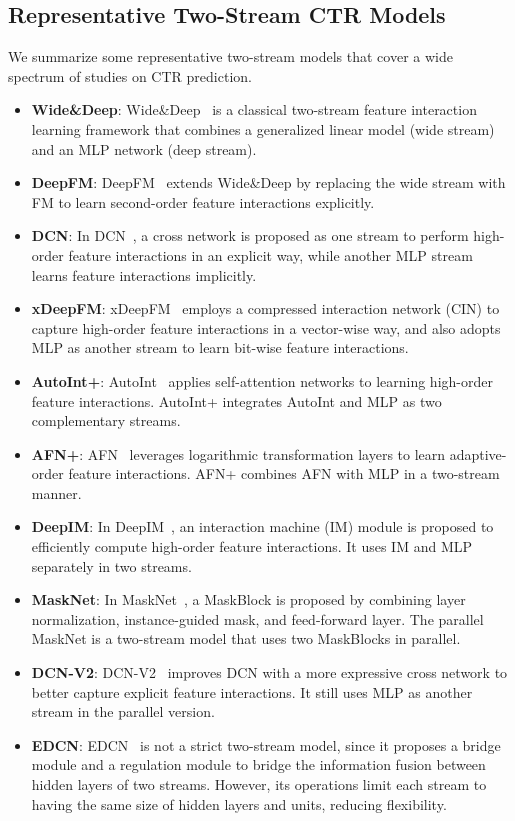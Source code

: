 \documentclass[letterpaper]{article} \usepackage{aaai23}  \usepackage{times}  \usepackage{helvet}  \usepackage{courier}  \usepackage[hyphens]{url}  \usepackage{graphicx} \urlstyle{rm} \def\UrlFont{\rm}  \usepackage{natbib}  \usepackage{caption} \frenchspacing  \setlength{\pdfpagewidth}{8.5in}  \setlength{\pdfpageheight}{11in}  \usepackage{algorithm}
\begin{document}
\subsection{Representative Two-Stream CTR Models} \label{sec:review_of_two_stream_model}
We summarize some representative two-stream models that cover a wide spectrum of studies on CTR prediction. 
\begin{itemize}
    \item \textbf{Wide\&Deep}: Wide\&Deep~\cite{WideDeep} is a classical two-stream feature interaction learning framework that combines a generalized linear model (wide stream) and an MLP network (deep stream).
    \item \textbf{DeepFM}: DeepFM~\cite{DeepFM} extends Wide\&Deep by replacing the wide stream with FM to learn second-order feature interactions explicitly.
    \item \textbf{DCN}: In DCN~\cite{DCN}, a cross network is proposed as one stream to perform  high-order feature interactions in an explicit way, while another MLP stream learns feature interactions implicitly. 
    \item \textbf{xDeepFM}: xDeepFM~\cite{xDeepFM} employs a compressed interaction network (CIN) to capture high-order feature interactions in a vector-wise way, and also adopts MLP as another stream to learn bit-wise feature interactions. 
    \item \textbf{AutoInt+}: AutoInt~\cite{autoint} applies self-attention networks to learning high-order feature interactions. AutoInt+ integrates AutoInt and MLP as two complementary streams.
    \item \textbf{AFN+}: AFN~\cite{AFN} leverages logarithmic transformation layers to learn adaptive-order feature interactions. AFN+ combines AFN with MLP in a two-stream manner.
    \item \textbf{DeepIM}: In DeepIM~\cite{DeepIM}, an interaction machine (IM) module is proposed to efficiently compute high-order feature interactions. It uses IM and MLP separately in two streams.
    \item \textbf{MaskNet}: In MaskNet~\cite{MaskNet}, a MaskBlock is proposed by combining layer normalization, instance-guided mask, and feed-forward layer. The parallel MaskNet is a two-stream model that uses two MaskBlocks in parallel.
    \item \textbf{DCN-V2}: DCN-V2~\cite{DCN_V2} improves DCN with a more expressive cross network to better capture explicit feature interactions. It still uses MLP as another stream in the parallel version.
    \item \textbf{EDCN}: EDCN~\cite{EDCN} is not a strict two-stream model, since it proposes a bridge module and a regulation module to bridge the information fusion between hidden layers of two streams. However, its operations limit each stream to having the same size of hidden layers and units, reducing flexibility.
\end{itemize}
\end{document}
